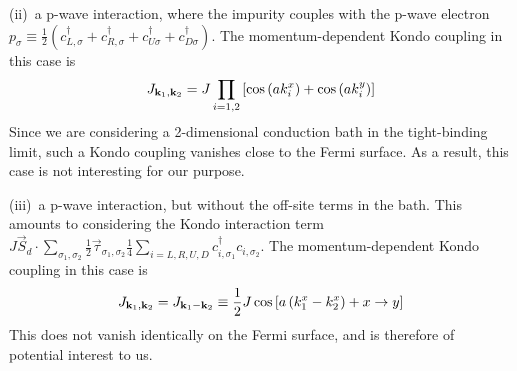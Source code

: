 \documentclass{revtex4-2}
\begin{document}
(ii)~a p-wave interaction, where the impurity couples with the p-wave electron \(p_\sigma \equiv \frac{1}{2}\left(c^\dagger_{L,\sigma} + c^\dagger_{R,\sigma} + c^\dagger_{U\sigma} + c^\dagger_{D\sigma}\right)\). The momentum-dependent Kondo coupling in this case is 
\begin{equation}\begin{aligned}\label{J_pwave}
	J_{{\bf k}_1, {\bf k}_2} = J\prod_{i=1,2}\left[\cos\left( ak_i^x \right) + \cos\left( ak_i^y \right) \right]
\end{aligned}\end{equation}
Since we are considering a 2-dimensional conduction bath in the tight-binding limit, such a Kondo coupling vanishes close to the Fermi surface. As a result, this case is not interesting for our purpose.

(iii)~a p-wave interaction, but without the off-site terms in the bath. This amounts to considering the Kondo interaction term \(J\vec{S}_d\cdot\sum_{\sigma_1,\sigma_2}\frac{1}{2}\vec{\tau}_{\sigma_1,\sigma_2}\frac{1}{4}\sum_{i=L,R,U,D}c^\dagger_{i,\sigma_1}c_{i,\sigma_2}\). The momentum-dependent Kondo coupling in this case is 
\begin{equation}\begin{aligned}\label{J_pwave_nooffsite}
	J_{{\bf k}_1, {\bf k}_2} = J_{{\bf k}_1 - {\bf k}_2} \equiv \frac{1}{2}J \cos\left[ a\left( k_1^x - k_2^x \right) + x\to y \right]
\end{aligned}\end{equation}
This does not vanish identically on the Fermi surface, and is therefore of potential interest to us.
\end{document}
